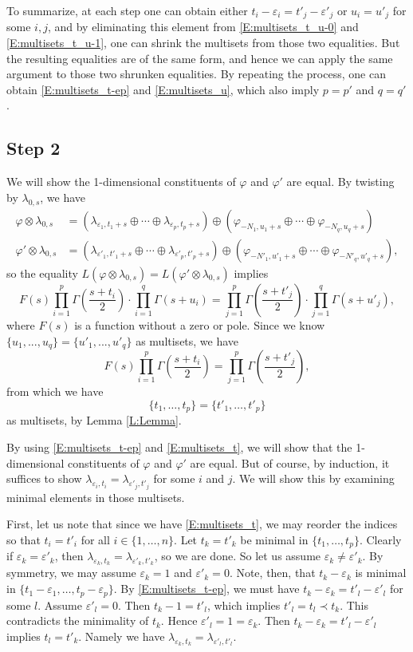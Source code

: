 \documentclass[11pt]{amsart}
\theoremstyle{plain}
\theoremstyle{definition}
\numberwithin{equation}{section}
\newcommand{\la}{\lambda}
\newcommand{\ep}{\varepsilon}
\begin{document}
To summarize, at each step one can obtain either
$t_i-\ep_i=t'_j-\ep'_j$ or $u_i=u'_j$ for some $i, j$, and by
eliminating this element from \eqref{E:multisets_t_u-0} and
\eqref{E:multisets_t_u-1}, one can shrink the multisets from those two
equalities. But the resulting equalities are of the same form, and
hence we can apply the same argument to those two shrunken
equalities. By repeating the process, one can obtain
\eqref{E:multisets_t-ep} and \eqref{E:multisets_u}, which also imply $p=p'$ and $q=q'$.



\subsection{Step 2}
We will show the 1-dimensional constituents of $\varphi$ and
$\varphi'$ are equal. By twisting by $\la_{0,s}$, we have
\begin{align*}
\varphi\otimes\lambda_{0, s}
&=\left(\lambda_{\ep_1, t_1+s}\oplus\cdots\oplus\lambda_{\ep_p,
  t_p+s}\right)
\oplus\left(\varphi_{-N_1, u_1+s}\oplus\cdots\oplus \varphi_{-N_q,
  u_q+s}\right)\\
\varphi'\otimes\lambda_{0, s}
&=\left(\lambda_{\ep'_1, t'_1+s}\oplus\cdots\oplus\lambda_{\ep'_p,
  t'_p+s}\right)
\oplus\left(\varphi_{-N'_1, u'_1+s}\oplus\cdots\oplus \varphi_{-N'_q,
  u'_q+s}\right),
\end{align*}
so the equality
$L(\varphi\otimes\la_{0,s})=L(\varphi'\otimes\la_{0,s})$
implies
\[
F(s)\prod_{i=1}^{p}\Gamma\left(\frac{s+t_i}{2}\right)\cdot\prod_{i=1}^q\Gamma(s+u_i)
=\prod_{j=1}^{p}\Gamma\left(\frac{s+t'_j}{2}\right)\cdot\prod_{j=1}^q\Gamma(s+u'_j),
\]
where $F(s)$ is a function without a zero or pole. Since we know
$\{u_1, ..., u_q\}=\{u'_1, ..., u'_q\}$ as multisets, we have
\[
F(s)\prod_{i=1}^{p}\Gamma\left(\frac{s+t_i}{2}\right)
=\prod_{j=1}^{p}\Gamma\left(\frac{s+t'_j}{2}\right),
\]
from which we have
\begin{equation}\label{E:multisets_t}
\{t_1,\dots,t_p\}=\{t'_1,\dots,t'_p\}
\end{equation}
as multisets, by Lemma \ref{L:Lemma}. 

By using \eqref{E:multisets_t-ep} and \eqref{E:multisets_t},
we will show that the 1-dimensional
constituents of $\varphi$ and $\varphi'$ are equal. But of course, by induction, it
suffices to show $\la_{\ep_i,t_i}=\la_{\ep'_j,t'_j}$ for some $i$ and
$j$. We will show this by examining minimal elements in those
multisets.

First, let us note that since we have \eqref{E:multisets_t}, we may
reorder the indices so that $t_i=t'_i$ for all
$i\in\{1,\dots,n\}$. Let $t_k=t'_k$ be minimal in
$\{t_1,\dots,t_p\}$. Clearly if $\ep_k=\ep'_k$, then $\la_{\ep_k,
  t_k}=\la_{\ep'_k, t'_k}$, so we are done. So let us assume
$\ep_k\neq\ep'_k$. By symmetry, we may assume $\ep_k=1$ and
$\ep'_k=0$. Note, then, that $t_k-\ep_k$ is
minimal in $\{t_1-\ep_1,\dots,t_p-\ep_p\}$. By
\eqref{E:multisets_t-ep}, we must have $t_k-\ep_k=t'_l-\ep'_l$ for some
$l$. Assume $\ep'_l= 0$. Then $t_k-1=t'_l$, which implies
$t'_l=t_l\prec t_k$. This contradicts the minimality of
$t_k$. Hence $\ep'_l=1=\ep_k$. Then $t_k-\ep_k=t'_l-\ep'_l$ implies
$t_l=t'_k$. Namely we have $\la_{\ep_k,t_k}=\la_{\ep'_l, t'_l}$.
\end{document}
